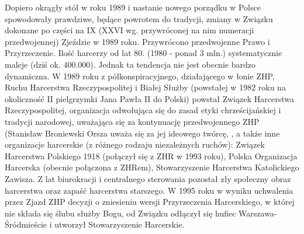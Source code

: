 Dopiero okrągły stół w roku 1989 i nastanie nowego porządku w Polsce spowodowały prawdziwe, będące powrotem do tradycji, zmiany w Związku dokonane po części na IX (XXVI wg. przywróconej na nim numeracji przedwojennej) Zjeździe w 1989 roku. Przywrócono przedwojenne Prawo i Przyrzeczenie. Ilość harcerzy od lat 80. (1980 - ponad 3 mln.) systematycznie maleje (dziś ok. 400.000). Jednak ta tendencja nie jest obecnie bardzo dynamiczna. W 1989 roku z półkonspiracyjnego, działającego w łonie ZHP, Ruchu Harcerstwa Rzeczypospolitej i Białej Służby (powstałej w 1982 roku na okoliczność II pielgrzymki Jana Pawła II do Polski) powstał Związek Harcerstwa Rzeczypospolitej, organizacja odwołująca się do zasad etyki chrześcijańskiej i tradycji narodowej, uważająca się za kontynuację przedwojennego ZHP (Stanisław Broniewski Orsza uważa się za jej ideowego twórcę, , a także inne organizacje harcerskie (z różnego rodzaju niezależnych ruchów): Związek Harcerstwa Polskiego 1918 (połączył się z ZHR w 1993 roku), Polska Organizacja Harcerska (obecnie połączona z ZHRem), Stowarzyszenie Harcerstwa Katolickiego Zawisza. Z lat biurokracji i centralnego sterowania pozostał zły społeczny obraz harcerstwa oraz zapaść harcerstwa starszego. W 1995 roku w wyniku uchwalenia przez Zjazd ZHP decyzji o zniesieniu wersji Przyrzeczenia Harcerskiego, w której nie składa się ślubu służby Bogu, od Związku odłączył się hufiec Warszawa-Śródmieście i utworzył Stowarzyszenie Harcerskie.